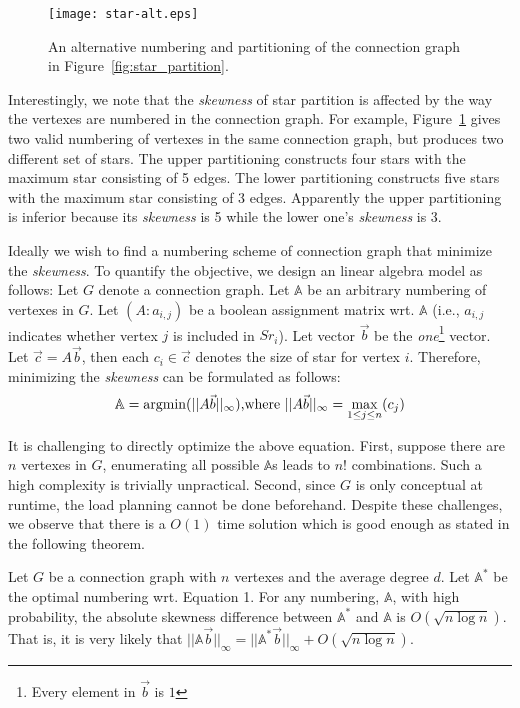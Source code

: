 \begin{figure}[h]
\centering
\texttt{[image: star-alt.eps]}
\caption{An alternative numbering and partitioning of the connection graph in Figure~\ref{fig:star_partition}.}
\label{fig:star-alt}
\end{figure}

Interestingly, we note that the \emph{skewness} of star partition is affected by
the way the vertexes are numbered in the connection graph. For example,
Figure~\ref{fig:star-alt} gives two valid numbering of vertexes 
in the same connection graph, but produces two different set of stars. 
The upper partitioning constructs four stars with the maximum star consisting of 5 edges.
The lower partitioning constructs five stars with the maximum star consisting of 3 edges.
Apparently the upper partitioning is inferior because its \emph{skewness} is 5 while the
lower one's \emph{skewness} is 3.

Ideally we wish to find a numbering scheme of connection graph
that minimize the \emph{skewness}.
To quantify the objective, we design an linear algebra model as follows: Let $G$ denote a connection graph.
Let $\mathbb{A}$ be an arbitrary numbering of vertexes in $G$.
Let $(A:a_{i,j})$ be a boolean assignment matrix wrt. $\mathbb{A}$ (i.e., $a_{i,j}$ indicates whether vertex $j$ is included in $Sr_i$). Let vector $\vec{b}$
be the \textit{one}\footnote{Every element in $\vec{b}$ is $1$} vector. Let $\vec{c} = A\vec{b}$, then
each $c_i \in \vec{c}$ denotes the size of star for vertex $i$.
Therefore, minimizing the \emph{skewness} can be formulated as follows:
\begin{equation}
\mathbb{A}  = \operatorname*{argmin}(||A\vec{b}||_\infty) \text{,where } ||A\vec{b}||_\infty = \max_{1\leq j \leq n}(c_j)
\end{equation}

It is challenging to directly optimize the above equation. 
First, suppose there are $n$ vertexes in $G$, enumerating
all possible $\mathbb{A}$s leads to $n!$ combinations. 
Such a high complexity is trivially unpractical. Second,
since $G$ is only conceptual at runtime, 
the load planning cannot be done beforehand. 
Despite these challenges, we observe that there is a 
$O(1)$ time solution which is good enough as stated in the 
following theorem.

\begin{theorem}
Let $G$ be a connection graph with $n$ vertexes and the average degree $d$.
Let $\mathbb{A}^*$ be the optimal numbering wrt. Equation 1.
For any numbering, $\mathbb{A}$, with high probability, the 
absolute skewness difference between $\mathbb{A}^*$ and $\mathbb{A}$ is $O(\sqrt{n \log n})$.
That is, it is very likely that 
$||\mathbb{A}\vec{b}||_\infty = ||\mathbb{A}^*\vec{b}||_\infty + O(\sqrt{n \log n})$.
\end{theorem}

